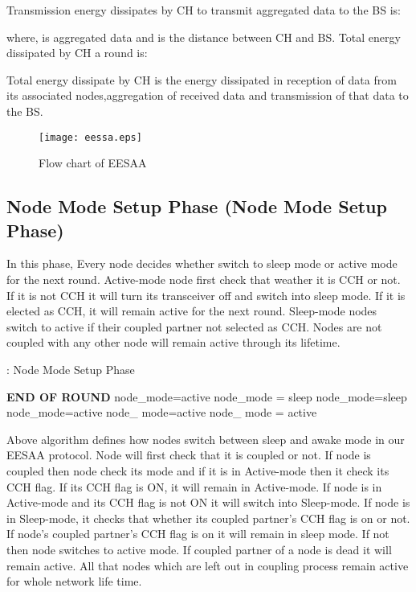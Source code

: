 \documentclass[journal]{IEEEtran}
\begin{document}
 Transmission energy  dissipates by CH to transmit aggregated data to the BS is:


 where,  is aggregated data and  is the distance between CH and BS. Total energy dissipated by CH  a round is:


 Total energy dissipate by CH is the energy dissipated in reception of data from its associated nodes,aggregation of received data and transmission of that data to the BS.

 \begin{figure*}[t]
\begin{center}
\texttt{[image: eessa.eps]}
\caption{Flow chart of EESAA}\label{Figure 33}
\end{center}
\end{figure*}

 \subsection{Node Mode Setup Phase (Node Mode Setup Phase)}
 In this phase, Every node decides whether switch to sleep mode or active mode for the next round. Active-mode node first check that weather it is CCH or not. If it is not CCH it will turn its transceiver off and switch into sleep mode. If it is elected as CCH, it will remain active for the next round. Sleep-mode nodes switch to active if their coupled partner not selected as CCH. Nodes are not coupled with any other node will remain active through its lifetime.


\begin{algorithm}[H]
\caption{: Node Mode Setup Phase}
\begin{algorithmic}[1]
\STATE \textbf{END OF ROUND}
                \STATE node\_mode=active
                \STATE node\_mode = sleep
                \STATE node\_mode=sleep
                \STATE node\_mode=active
         \ENDIF
               \STATE node\_ mode=active
     \ELSE
                \STATE node\_ mode = active
   \ENDIF
\end{algorithmic}
\end{algorithm}

 Above algorithm defines how nodes switch between sleep and awake mode in our EESAA protocol. Node will first check that it is coupled or not. If node is coupled then node check its mode and if it is in Active-mode then it check its CCH flag. If its CCH flag is ON, it will remain in Active-mode. If node is in Active-mode and its CCH flag is not ON it will switch into Sleep-mode. If node is in Sleep-mode, it checks that whether its coupled partner's CCH flag is on or not. If node's coupled partner's CCH flag is on it will remain in sleep mode. If not then node switches to active mode. If coupled partner of a node is dead it will remain active. All that nodes which are left out in coupling process remain active for whole network life time.
\end{document}
